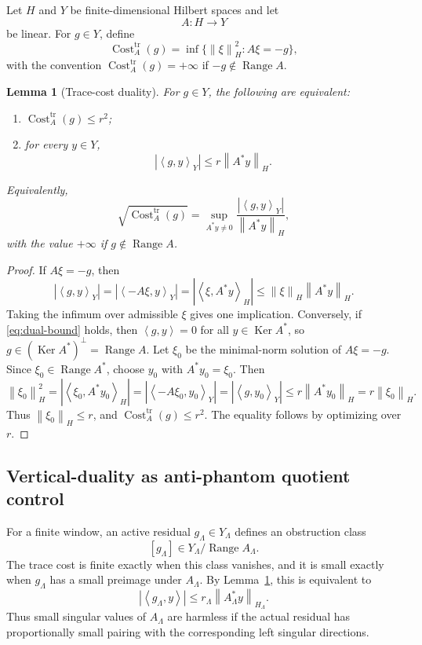 \documentclass[11pt]{article}
\numberwithin{equation}{section}
\newtheorem{lemma}[theorem]{Lemma}
\DeclareMathOperator{\Range}{Range}
\DeclareMathOperator{\Ker}{Ker}
\DeclareMathOperator{\Cost}{Cost}
\newcommand{\trc}{\mathrm{tr}}
\newcommand{\norm}[2]{\left\|#1\right\|_{#2}}
\newcommand{\ip}[2]{\left\langle #1,#2\right\rangle}
\begin{document}
Let \(H\) and \(Y\) be finite-dimensional Hilbert spaces and let
\[
A:H\to Y
\]
be linear.  For \(g\in Y\), define
\begin{equation}\label{eq:trace-cost-def}
\Cost_A^{\trc}(g)=\inf\{\norm{\xi}{H}^2:A\xi=-g\},
\end{equation}
with the convention \(\Cost_A^{\trc}(g)=+\infty\) if \(-g\notin\Range A\).

\begin{lemma}[Trace-cost duality]\label{lem:trace-cost-duality}
For \(g\in Y\), the following are equivalent:
\begin{enumerate}[label=(\roman*)]
\item \(\Cost_A^{\trc}(g)\le r^2\);
\item for every \(y\in Y\),
\begin{equation}\label{eq:dual-bound}
|\ip{g}{y}_Y|\le r\norm{A^*y}{H}.
\end{equation}
\end{enumerate}
Equivalently,
\begin{equation}\label{eq:cost-dual-equality}
\sqrt{\Cost_A^{\trc}(g)}=
\sup_{A^*y\ne0}\frac{|\ip{g}{y}_Y|}{\norm{A^*y}{H}},
\end{equation}
with the value \(+\infty\) if \(g\notin\Range A\).
\end{lemma}

\begin{proof}
If \(A\xi=-g\), then
\[
|\ip{g}{y}_Y|=|\ip{-A\xi}{y}_Y|=|\ip{\xi}{A^*y}_H|
\le\norm{\xi}{H}\norm{A^*y}{H}.
\]
Taking the infimum over admissible \(\xi\) gives one implication.  Conversely, if \eqref{eq:dual-bound} holds, then \(\ip{g}{y}=0\) for all \(y\in\Ker A^*\), so \(g\in(\Ker A^*)^\perp=\Range A\).  Let \(\xi_0\) be the minimal-norm solution of \(A\xi=-g\).  Since \(\xi_0\in\Range A^*\), choose \(y_0\) with \(A^*y_0=\xi_0\).  Then
\[
\norm{\xi_0}{H}^2
=|\ip{\xi_0}{A^*y_0}_H|
=|\ip{-A\xi_0}{y_0}_Y|
=|\ip{g}{y_0}_Y|
\le r\norm{A^*y_0}{H}=r\norm{\xi_0}{H}.
\]
Thus \(\norm{\xi_0}{H}\le r\), and \(\Cost_A^{\trc}(g)\le r^2\).  The equality follows by optimizing over \(r\).
\end{proof}

\subsection{Vertical-duality as anti-phantom quotient control}

For a finite window, an active residual \(g_\Lambda\in Y_\Lambda\) defines an obstruction class
\[
[g_\Lambda]\in Y_\Lambda/\Range A_\Lambda.
\]
The trace cost is finite exactly when this class vanishes, and it is small exactly when \(g_\Lambda\) has a small preimage under \(A_\Lambda\).  By Lemma~\ref{lem:trace-cost-duality}, this is equivalent to
\begin{equation}\label{eq:active-residual-pairing}
|\ip{g_\Lambda}{y}|
\le r_\Lambda\norm{A_\Lambda^*y}{H_\Lambda}.
\end{equation}
Thus small singular values of \(A_\Lambda\) are harmless if the actual residual has proportionally small pairing with the corresponding left singular directions.
\end{document}
